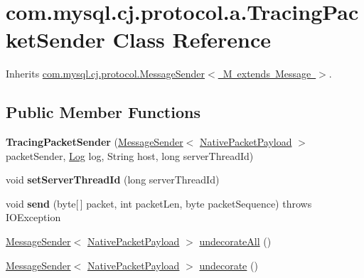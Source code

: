 \hypertarget{classcom_1_1mysql_1_1cj_1_1protocol_1_1a_1_1_tracing_packet_sender}{}\section{com.\+mysql.\+cj.\+protocol.\+a.\+Tracing\+Packet\+Sender Class Reference}
\label{classcom_1_1mysql_1_1cj_1_1protocol_1_1a_1_1_tracing_packet_sender}


Inherits \mbox{\hyperlink{interfacecom_1_1mysql_1_1cj_1_1protocol_1_1_message_sender}{com.\+mysql.\+cj.\+protocol.\+Message\+Sender$<$ M extends Message $>$}}.

\subsection*{Public Member Functions}
\begin{DoxyCompactItemize}
\item 
\mbox{\label{classcom_1_1mysql_1_1cj_1_1protocol_1_1a_1_1_tracing_packet_sender_a01a618aba9572be7d375093b4984a827}} 
{\bfseries Tracing\+Packet\+Sender} (\mbox{\hyperlink{interfacecom_1_1mysql_1_1cj_1_1protocol_1_1_message_sender}{Message\+Sender}}$<$ \mbox{\hyperlink{classcom_1_1mysql_1_1cj_1_1protocol_1_1a_1_1_native_packet_payload}{Native\+Packet\+Payload}} $>$ packet\+Sender, \mbox{\hyperlink{interfacecom_1_1mysql_1_1cj_1_1log_1_1_log}{Log}} log, String host, long server\+Thread\+Id)
\item 
\mbox{\label{classcom_1_1mysql_1_1cj_1_1protocol_1_1a_1_1_tracing_packet_sender_a97d2d479b56668ca11369ad3702483bf}} 
void {\bfseries set\+Server\+Thread\+Id} (long server\+Thread\+Id)
\item 
\mbox{\label{classcom_1_1mysql_1_1cj_1_1protocol_1_1a_1_1_tracing_packet_sender_addcfce3e7ea16adf7933a367fb8f5904}} 
void {\bfseries send} (byte\mbox{[}$\,$\mbox{]} packet, int packet\+Len, byte packet\+Sequence)  throws I\+O\+Exception 
\item 
\mbox{\hyperlink{interfacecom_1_1mysql_1_1cj_1_1protocol_1_1_message_sender}{Message\+Sender}}$<$ \mbox{\hyperlink{classcom_1_1mysql_1_1cj_1_1protocol_1_1a_1_1_native_packet_payload}{Native\+Packet\+Payload}} $>$ \mbox{\hyperlink{classcom_1_1mysql_1_1cj_1_1protocol_1_1a_1_1_tracing_packet_sender_a57670e7bdafb2dd88cb711fb7e60266d}{undecorate\+All}} ()
\item 
\mbox{\hyperlink{interfacecom_1_1mysql_1_1cj_1_1protocol_1_1_message_sender}{Message\+Sender}}$<$ \mbox{\hyperlink{classcom_1_1mysql_1_1cj_1_1protocol_1_1a_1_1_native_packet_payload}{Native\+Packet\+Payload}} $>$ \mbox{\hyperlink{classcom_1_1mysql_1_1cj_1_1protocol_1_1a_1_1_tracing_packet_sender_aed3dc47d6e7a4dad4761e05b2f9213de}{undecorate}} ()
\end{DoxyCompactItemize}


